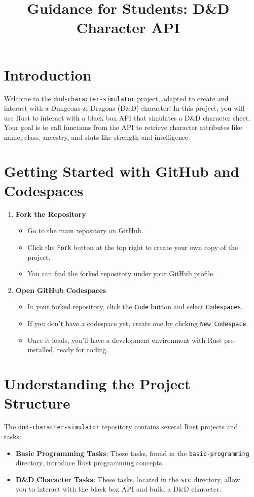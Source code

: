 \documentclass{article}
\title{Guidance for Students: D\&D Character API}
\author{}
\date{}
\begin{document}
	
	\maketitle
	
	\section*{Introduction}
	Welcome to the \texttt{dnd-character-simulator} project, adapted to create and interact with a Dungeons \& Dragons (D\&D) character! In this project, you will use Rust to interact with a black box API that simulates a D\&D character sheet. Your goal is to call functions from the API to retrieve character attributes like name, class, ancestry, and stats like strength and intelligence.
	
	\section*{Getting Started with GitHub and Codespaces}
	\begin{enumerate}
		\item \textbf{Fork the Repository}
		\begin{itemize}
			\item Go to the main repository on GitHub.
			\item Click the \texttt{Fork} button at the top right to create your own copy of the project.
			\item You can find the forked repository under your GitHub profile.
		\end{itemize}
		
		\item \textbf{Open GitHub Codespaces}
		\begin{itemize}
			\item In your forked repository, click the \texttt{Code} button and select \texttt{Codespaces}.
			\item If you don’t have a codespace yet, create one by clicking \texttt{New Codespace}.
			\item Once it loads, you’ll have a development environment with Rust pre-installed, ready for coding.
		\end{itemize}
	\end{enumerate}
	
	\section*{Understanding the Project Structure}
	The \texttt{dnd-character-simulator} repository contains several Rust projects and tasks:
	\begin{itemize}
		\item \textbf{Basic Programming Tasks}: These tasks, found in the \texttt{basic-programming} directory, introduce Rust programming concepts.
		\item \textbf{D\&D Character Tasks}: These tasks, located in the \texttt{src} directory, allow you to interact with the black box API and build a D\&D character.
	\end{itemize}
	
\end{document}
